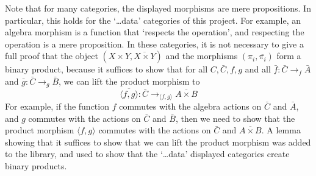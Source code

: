 Note that for many categories, the displayed morphisms are mere propositions. In particular, this holds for the `\dots data' categories of this project. For example, an algebra morphism is a function that `respects the operation', and respecting the operation is a mere proposition. In these categories, it is not necessary to give a full proof that the object $ (X \times Y, \overline{X \times Y}) $ and the morphisms $ (\pi_i, \overline{\pi_i}) $ form a binary product, because it suffices to show that for all $ C, \bar C, f, g $ and all $ \bar f : \bar C \to_f \bar A $ and $ \bar g : \bar C \to_g \bar B $, we can lift the product morphism to
\[ \overline{\langle f, g \rangle} : \bar C \to_{\langle f, g \rangle} \overline{A \times B} \]
For example, if the function $ f $ commutes with the algebra actions on $ \bar C $ and $ \bar A $, and $ g $ commutes with the actions on $ \bar C $ and $ \bar B $, then we need to show that the product morphism $ \langle f, g \rangle $ commutes with the actions on $ \bar C $ and $ \overline{A \times B} $. A lemma showing that it suffices to show that we can lift the product morphism was added to the library, and used to show that the `\dots data' displayed categories create binary products.

